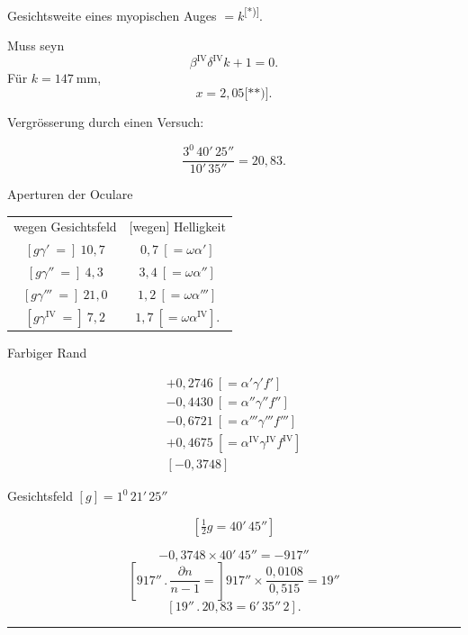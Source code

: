 \clearpage{}
Gesichtsweite eines myopischen Auges $=k$\textsuperscript{[*)]}.\par
\begingroup\renewcommand{\thefootnote}{}\endgroup
\noindent\hspace*{\parindent}Muss seyn
\[
\beta^{\mathrm{IV}}\delta^{\mathrm{IV}}k+1=0.
\]
\noindent\hspace*{\parindent}Für $k=147\ \mathrm{mm}$,
\[
x=2{,}05\text{[**)]}.
\]
\begingroup\renewcommand{\thefootnote}{}\endgroup
\begin{center}Vergrösserung durch einen Versuch:\end{center}
\[
\frac{3^{0}\,40'\,25''}{10'\,35''}=20{,}83.
\]
\begin{center}Aperturen der Oculare\end{center}
\begin{center}
\renewcommand{\arraystretch}{1.35}\setlength{\tabcolsep}{1em}
\begin{tabular}{c|c}
wegen Gesichtsfeld&[wegen] Helligkeit\\
$[g\gamma'\ ={}]\ 10{,}7$&$0{,}7\ [=\omega\alpha']$\\
$[g\gamma''\ ={}]\ 4{,}3$&$3{,}4\ [=\omega\alpha'']$\\
$[g\gamma'''\ ={}]\ 21{,}0$&$1{,}2\ [=\omega\alpha''']$\\
$[g\gamma^{\mathrm{IV}}\ ={}]\ 7{,}2$&$1{,}7\ [=\omega\alpha^{\mathrm{IV}}].$
\end{tabular}
\end{center}
\noindent\begin{minipage}[t]{.47\linewidth}
\begin{center}Farbiger Rand\end{center}
\[
\begin{array}{l}
+0{,}2746\ [=\alpha'\gamma'f']\\
-0{,}4430\ [=\alpha''\gamma''f'']\\
-0{,}6721\ [=\alpha'''\gamma'''f''']\\
+0{,}4675\ [=\alpha^{\mathrm{IV}}\gamma^{\mathrm{IV}}f^{\mathrm{IV}}]\\\hline
{}[-0{,}3748]
\end{array}
\]
\end{minipage}\hfill\begin{minipage}[t]{.51\linewidth}
\begin{center}Gesichtsfeld $[g]=1^{0}\,21'\,25''$\end{center}
\[ [\tfrac12 g=40'\,45''] \]
\end{minipage}
\[
-0{,}3748\times40'\,45''=-917''
\]
\[
\left[917''\mathbin{.}\frac{\partial n}{n-1}=\right]
917''\times\frac{0{,}0108}{0{,}515}=19''
\]
\[
[19''\mathbin{.}20{,}83=6'\,35''\,2].
\]
\begin{center}\rule{.2\linewidth}{.4pt}\end{center}
\clearpage\endgroup
